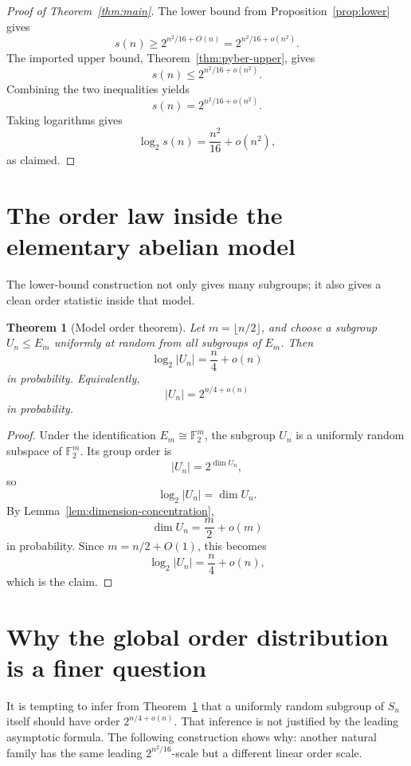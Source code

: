 \documentclass[a4paper,11pt]{amsart}
\newtheorem{theorem}{Theorem}[section]
\theoremstyle{remark}
\newcommand{\F}{\mathbb F}
\begin{document}
\begin{proof}[Proof of Theorem~\ref{thm:main}]
The lower bound from Proposition~\ref{prop:lower} gives
\[
        s(n)\geq 2^{n^2/16+O(n)}=2^{n^2/16+o(n^2)}.
\]
The imported upper bound, Theorem~\ref{thm:pyber-upper}, gives
\[
        s(n)\leq 2^{n^2/16+o(n^2)}.
\]
Combining the two inequalities yields
\[
        s(n)=2^{n^2/16+o(n^2)}.
\]
Taking logarithms gives
\[
        \log_2 s(n)=\frac{n^2}{16}+o(n^2),
\]
as claimed.
\end{proof}

\section{The order law inside the elementary abelian model}\label{sec:model-order}

The lower-bound construction not only gives many subgroups; it also gives a clean order statistic
inside that model.

\begin{theorem}[Model order theorem]\label{thm:model-order}
Let \(m=\lfloor n/2\rfloor\), and choose a subgroup \(U_n\leq E_m\) uniformly at random from all
subgroups of \(E_m\). Then
\[
        \log_2 |U_n|=\frac n4+o(n)
\]
in probability. Equivalently,
\[
        |U_n|=2^{n/4+o(n)}
\]
in probability.
\end{theorem}

\begin{proof}
Under the identification \(E_m\cong \F_2^m\), the subgroup \(U_n\) is a uniformly random subspace
of \(\F_2^m\). Its group order is
\[
        |U_n|=2^{\dim U_n},
\]
so
\[
        \log_2 |U_n|=\dim U_n.
\]
By Lemma~\ref{lem:dimension-concentration},
\[
        \dim U_n=\frac m2+o(m)
\]
in probability. Since \(m=n/2+O(1)\), this becomes
\[
        \log_2 |U_n|=\frac n4+o(n),
\]
which is the claim.
\end{proof}

\section{Why the global order distribution is a finer question}\label{sec:dihedral}

It is tempting to infer from Theorem~\ref{thm:model-order} that a uniformly random subgroup of
\(S_n\) itself should have order \(2^{n/4+o(n)}\). That inference is not justified by the leading
asymptotic formula. The following construction shows why: another natural family has the same
leading \(2^{n^2/16}\)-scale but a different linear order scale.
\end{document}

